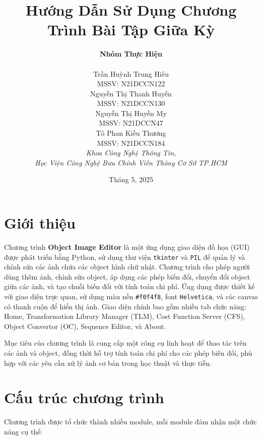 \documentclass[a4paper,12pt]{article}
\title{\textbf{Hướng Dẫn Sử Dụng Chương Trình Bài Tập Giữa Kỳ}}
\author{
    \textbf{Nhóm Thực Hiện} \\[12pt]
    \begin{tabular}{c}
        Trần Huỳnh Trung Hiếu \\ MSSV: N21DCCN122 \\[8pt]
        Nguyễn Thị Thanh Huyến \\ MSSV: N21DCCN130 \\[8pt]
        Nguyễn Thị Huyền My \\ MSSV: N21DCCN47 \\[8pt]
        Tô Phan Kiều Thương \\ MSSV: N21DCCN184 \\[12pt]
        \textit{Khoa Công Nghệ Thông Tin,} \\
        \textit{Học Viện Công Nghệ Bưu Chính Viễn Thông Cơ Sở TP.HCM}
    \end{tabular}
}
\date{Tháng 5, 2025}
\begin{document}
\maketitle
\thispagestyle{empty}
\newpage

\tableofcontents
\newpage

\section{Giới thiệu}
Chương trình \textbf{Object Image Editor} là một ứng dụng giao diện đồ họa (GUI) được phát triển bằng Python, sử dụng thư viện \texttt{tkinter} và \texttt{PIL} để quản lý và chỉnh sửa các ảnh chứa các object hình chữ nhật. Chương trình cho phép người dùng thêm ảnh, chỉnh sửa object, áp dụng các phép biến đổi, chuyển đổi object giữa các ảnh, và tạo chuỗi biến đổi với tính toán chi phí. Ứng dụng được thiết kế với giao diện trực quan, sử dụng màu nền \texttt{\#f0f4f8}, font \texttt{Helvetica}, và các canvas có thanh cuộn để hiển thị ảnh. Giao diện chính bao gồm nhiều tab chức năng: Home, Transformation Library Manager (TLM), Cost Function Server (CFS), Object Convertor (OC), Sequence Editor, và About.

Mục tiêu của chương trình là cung cấp một công cụ linh hoạt để thao tác trên các ảnh và object, đồng thời hỗ trợ tính toán chi phí cho các phép biến đổi, phù hợp với các yêu cầu xử lý ảnh cơ bản trong học thuật và thực tiễn.

\section{Cấu trúc chương trình}
Chương trình được tổ chức thành nhiều module, mỗi module đảm nhận một chức năng cụ thể:
\end{document}
